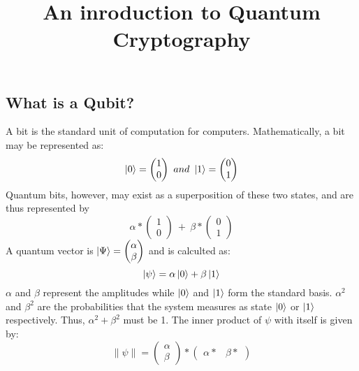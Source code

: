 \documentclass{scrartcl}
\begin{document}
\title{An inroduction to Quantum Cryptography}

\subsection{What is a Qubit?}
A bit is the standard unit of computation for computers. Mathematically, a bit may be represented as:
	\begin{equation} \ket{0}=\begin{pmatrix} 1\\0 \end{pmatrix} \ and \ \ket{1}=\begin{pmatrix} 0\\1 \end{pmatrix} \end{equation}
Quantum bits, however, may exist as a superposition of these two states, and are thus represented by
	\begin{equation} \alpha * \begin{pmatrix} 1\\0 \end{pmatrix} \ + \ \beta * \begin{pmatrix} 0\\1 \end{pmatrix} \end{equation}
A quantum vector is $\ket{\Psi} = \begin{pmatrix} \alpha\\ \beta \end{pmatrix}$ and is calculted as:
	\begin{equation} \ket{\psi} = \alpha \ket{0} + \beta \ket{1} \end{equation}
		$\alpha$ and $\beta$ represent the amplitudes while $\ket{0}$ and $\ket{1}$ form the standard basis. $\alpha^2$ and $\beta^2$ are the probabilities that the system measures as state $\ket{0}$ or $\ket{1}$ respectively. Thus, $\alpha^2 + \beta^2$ must be 1.  
The inner product of $\psi$ with itself is given by:
	\begin{equation} \| \psi \| = \begin{pmatrix} \alpha \\ \beta \end{pmatrix} * \begin{pmatrix} \alpha* & \beta* \end{pmatrix} \end{equation}
		
		
\end{document}
